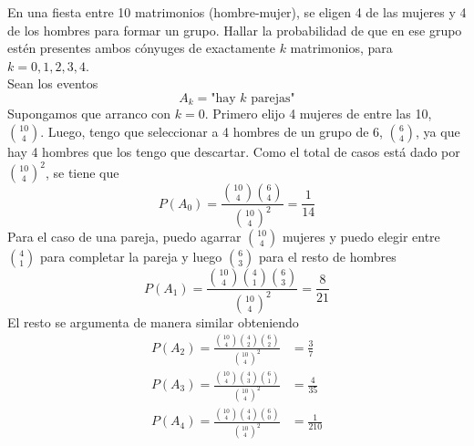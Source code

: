 \item En una fiesta entre 10 matrimonios (hombre-mujer), se eligen 4 de las mujeres y 4 de los hombres para formar un grupo. Hallar la probabilidad de que en ese grupo estén presentes ambos cónyuges de exactamente $k$ matrimonios, para $k=0,1,2,3,4$.\e\\
    Sean los eventos\[A_k=\text{"hay $k$ parejas"}\]
    Supongamos que arranco con $k=0$. Primero elijo 4 mujeres de entre las 10, $\binom{10}{4}$. Luego, tengo que seleccionar a 4 hombres de un grupo de 6, $\binom{6}{4}$, ya que hay 4 hombres que los tengo que descartar. Como el total de casos está dado por ${\binom{10}{4}}^2$, se tiene que\[P(A_0)=\frac{\binom{10}{4}\binom{6}{4}}{{\binom{10}{4}}^2}=\frac{1}{14}\]
    Para el caso de una pareja, puedo agarrar $\binom{10}{4}$ mujeres y puedo elegir entre $\binom{4}{1}$ para completar la pareja y luego $\binom{6}{3}$ para el resto de hombres\[P(A_1)=\frac{\binom{10}{4}\binom{4}{1}\binom{6}{3}}{{\binom{10}{4}}^2}=\frac{8}{21}\]
    El resto se argumenta de manera similar obteniendo\begin{align*}
        P(A_2)=\frac{\binom{10}{4}\binom{4}{2}\binom{6}{2}}{{\binom{10}{4}}^2}&=\frac{3}{7}\\
        P(A_3)=\frac{\binom{10}{4}\binom{4}{3}\binom{6}{1}}{{\binom{10}{4}}^2}&=\frac{4}{35}\\
        P(A_4)=\frac{\binom{10}{4}\binom{4}{4}\binom{6}{0}}{{\binom{10}{4}}^2}&=\frac{1}{210}
    \end{align*}